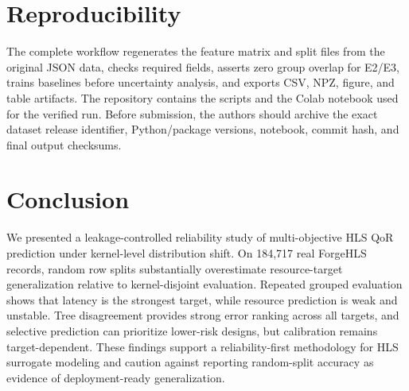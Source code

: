 \documentclass[conference]{IEEEtran}
\begin{document}
\section{Reproducibility}
The complete workflow regenerates the feature matrix and split files from the original JSON data, checks required fields, asserts zero group overlap for E2/E3, trains baselines before uncertainty analysis, and exports CSV, NPZ, figure, and table artifacts. The repository contains the scripts and the Colab notebook used for the verified run. Before submission, the authors should archive the exact dataset release identifier, Python/package versions, notebook, commit hash, and final output checksums.

\section{Conclusion}
We presented a leakage-controlled reliability study of multi-objective HLS QoR prediction under kernel-level distribution shift. On 184,717 real ForgeHLS records, random row splits substantially overestimate resource-target generalization relative to kernel-disjoint evaluation. Repeated grouped evaluation shows that latency is the strongest target, while resource prediction is weak and unstable. Tree disagreement provides strong error ranking across all targets, and selective prediction can prioritize lower-risk designs, but calibration remains target-dependent. These findings support a reliability-first methodology for HLS surrogate modeling and caution against reporting random-split accuracy as evidence of deployment-ready generalization.



\end{document}
